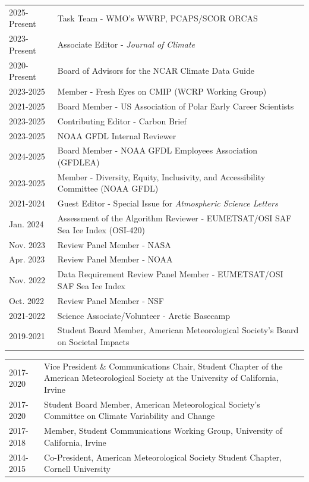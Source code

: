 \documentclass[margin,line,palatino,courier,10pt]{res}
\begin{document}
\begin{resume}
\begin{tabular}{@{}p{0.9in}p{4in}}
2025-Present & Task Team - WMO's WWRP, PCAPS/SCOR ORCAS\\
2023-Present & Associate Editor - \textit{Journal of Climate}\\
2020-Present & Board of Advisors for the NCAR Climate Data Guide\\
2023-2025 & Member - Fresh Eyes on CMIP (WCRP Working Group)\\
2021-2025 & Board Member - US Association of Polar Early Career Scientists\\
2023-2025 & Contributing Editor - Carbon Brief\\
2023-2025 & NOAA GFDL Internal Reviewer\\
2024-2025 & Board Member - NOAA GFDL Employees Association (GFDLEA)\\
2023-2025 & Member - Diversity, Equity, Inclusivity, and Accessibility Committee (NOAA GFDL)\\
2021-2024 & Guest Editor - Special Issue for \textit{Atmospheric Science Letters}\\
Jan. 2024 & Assessment of the Algorithm Reviewer -  EUMETSAT/OSI SAF Sea Ice Index (OSI-420)\\ 
Nov. 2023 & Review Panel Member - NASA\\
Apr. 2023 & Review Panel Member - NOAA\\
Nov. 2022 & Data Requirement Review Panel Member -  EUMETSAT/OSI SAF Sea Ice Index\\ 
Oct. 2022 & Review Panel Member - NSF\\
2021-2022 & Science Associate/Volunteer - Arctic Basecamp\\
2019-2021& Student Board Member, American Meteorological Society's Board on Societal Impacts\\
\end{tabular}
\begin{tabular}{@{}p{0.9in}p{4in}}
2017-2020 & Vice President \& Communications Chair, Student Chapter of the American Meteorological Society at the University of California, Irvine\\
2017-2020 & Student Board Member, American Meteorological Society's Committee on Climate Variability and Change\\
2017-2018 & Member, Student Communications Working Group, University of California, Irvine\\
2014-2015 & Co-President, American Meteorological Society Student Chapter, Cornell University\\
\end{tabular}


\end{resume}
\end{document}
